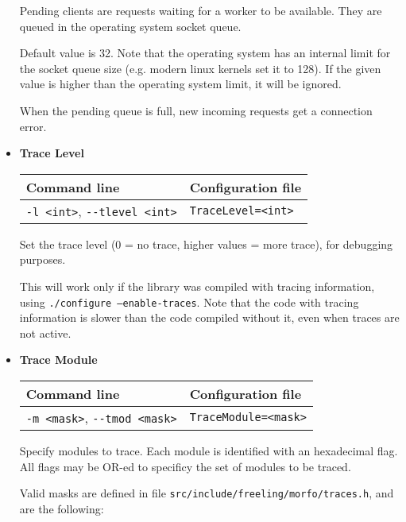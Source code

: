 \documentclass[a4paper]{book}
\begin{document}
\begin{itemize}
  Pending clients are requests waiting for a worker to be available. 
  They are queued in the operating system socket queue.

  Default value is 32. Note that the operating system has an internal 
  limit for the socket queue size (e.g. modern linux kernels set it to 128). 
  If the given value is higher than the operating system limit, it will
  be ignored.

  When the pending queue is full, new incoming requests get a
  connection error.

\item {\bf Trace Level}

\begin{tabular}{|l|l|}
Command line       & Configuration file   \\ \hline
\verb#-l <int>#, \verb#--tlevel <int>#   & \verb#TraceLevel=<int>#  \\ \hline
\end{tabular}

 Set the trace level (0 = no trace, higher values = more trace), for
 debugging purposes.

 This will work only if the library was compiled with tracing information, 
 using {\tt ./configure --enable-traces}.
 Note that the code with tracing information is slower than the code 
 compiled without it, even when traces are not active.

\item {\bf Trace Module}

\begin{tabular}{|l|l|}
Command line       & Configuration file   \\ \hline
\verb#-m <mask>#, \verb#--tmod <mask>#  & \verb#TraceModule=<mask>#  \\ \hline
\end{tabular}

  Specify modules to trace. Each module is identified with an hexadecimal flag.
 All flags may be OR-ed to specificy the set of modules to be traced.

 Valid masks are defined in file \verb#src/include/freeling/morfo/traces.h#, 
and are the following:


\end{itemize}
\end{document}
